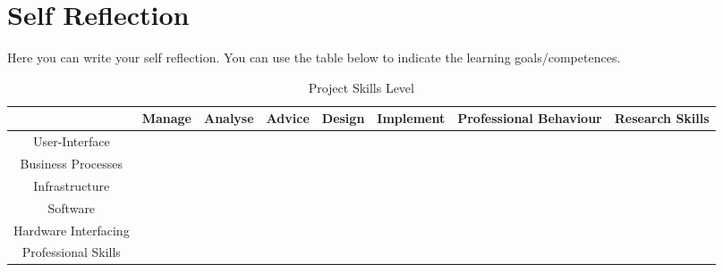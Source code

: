 \chapter*{Self Reflection}

Here you can write your self reflection. You can use the table below to indicate the learning goals/competences.

\begin{table}[H]
	\centering
	\begin{adjustbox}{width={\textwidth}}
		\small
	\begin{tabular}{|c|c|c|c|c|c|c|c|}
		\hline
		& Manage & Analyse & Advice & Design & Implement & Professional Behaviour & Research Skills \\ \hline
		User-Interface & & &  & & & & \\ \hline
		Business Processes & &  &  & & & & \\ \hline
		Infrastructure & &  & &  & & & \\ \hline
		Software &  &  &  &  &  & & \\ \hline
		Hardware Interfacing & & & & & & & \\ \hline
		Professional Skills & & & & & &  &  \\ \hline
	\end{tabular}
\end{adjustbox}
	\caption{Project Skills Level}
	\label{currentskills}
\end{table}